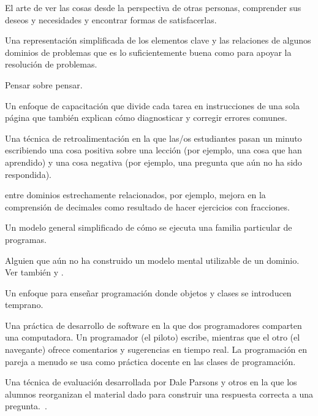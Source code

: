 \begin{description}
 El arte de ver las cosas desde la perspectiva 
de otras personas, comprender sus deseos y necesidades y encontrar formas de satisfacerlas.



 Una representación simplificada 
de los elementos clave y las relaciones de algunos dominios de problemas que es 
lo suficientemente buena como para apoyar la resolución de problemas.

 Pensar sobre pensar.

 Un enfoque de capacitación que divide 
cada tarea en instrucciones de una sola página que también 
explican cómo diagnosticar y corregir errores comunes.

 Una técnica de retroalimentación en la 
que las/os estudiantes pasan un minuto escribiendo una cosa positiva sobre una lección 
(por ejemplo, una cosa que han aprendido) y una cosa negativa (por ejemplo, una pregunta que aún no ha sido respondida).

  entre dominios estrechamente relacionados, por ejemplo, mejora en la comprensión de decimales como resultado de hacer ejercicios con fracciones.

 Un modelo general simplificado de cómo se ejecuta una familia particular de programas.

 Alguien que aún no ha construido un modelo mental utilizable de un dominio. Ver también  y .

 Un enfoque para enseñar programación donde 
objetos y clases se introducen temprano.

 Una práctica de desarrollo de software en la que dos programadores comparten una computadora. Un programador (el piloto) escribe, mientras que el otro (el navegante) ofrece comentarios y sugerencias en tiempo real. La programación en pareja a menudo se usa como práctica docente en las clases de programación.


 Una técnica de evaluación desarrollada 
por Dale Parsons y otros en la que los alumnos reorganizan el material dado 
para construir una respuesta correcta a una pregunta.~\cite{Pars2006}.










\end{description}
